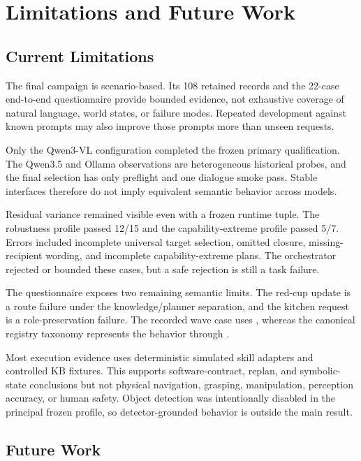 \chapter{Limitations and Future Work}
\label{chap:limitations-future-work}

\section{Current Limitations}

The final campaign is scenario-based. Its 108 retained records and the 22-case end-to-end questionnaire provide bounded evidence, not exhaustive coverage of natural language, world states, or failure modes. Repeated development against known prompts may also improve those prompts more than unseen requests.

Only the Qwen3-VL configuration completed the frozen primary qualification. The Qwen3.5 and Ollama observations are heterogeneous historical probes, and the final  selection has only preflight and one dialogue smoke pass. Stable interfaces therefore do not imply equivalent semantic behavior across models.

Residual variance remained visible even with a frozen runtime tuple. The robustness profile passed 12/15 and the capability-extreme profile passed 5/7. Errors included incomplete universal target selection, omitted closure, missing-recipient wording, and incomplete capability-extreme plans. The orchestrator rejected or bounded these cases, but a safe rejection is still a task failure.

The questionnaire exposes two remaining semantic limits. The red-cup update is a route failure under the knowledge/planner separation, and the kitchen request is a role-preservation failure. The recorded wave case uses , whereas the canonical registry taxonomy represents the behavior through .

Most execution evidence uses deterministic simulated skill adapters and controlled KB fixtures. This supports software-contract, replan, and symbolic-state conclusions but not physical navigation, grasping, manipulation, perception accuracy, or human safety. Object detection was intentionally disabled in the principal frozen profile, so detector-grounded behavior is outside the main result.

\section{Future Work}

